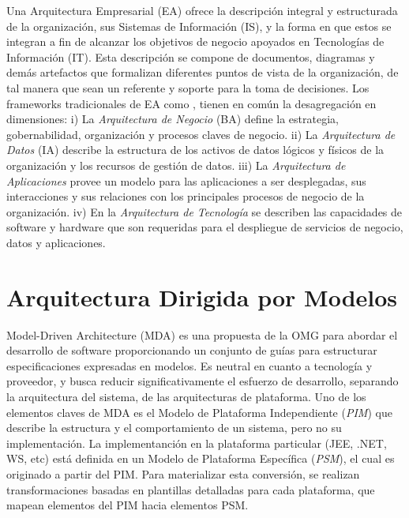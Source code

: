 Una Arquitectura Empresarial (EA) ofrece la descripci\'on integral y estructurada de la organizaci\'on, sus Sistemas de Informaci\'on (IS), y la forma en que estos se integran a fin de alcanzar los objetivos de negocio apoyados en Tecnolog\'ias de Informaci\'on (IT). Esta descripci\'on se compone de documentos, diagramas y dem\'as artefactos que formalizan diferentes puntos de vista de la organizaci\'on, de tal manera que sean un referente y soporte para la toma de decisiones. Los frameworks tradicionales de EA como \cite{Zachman:1987, DoDAF:2005, OpenGroup:2008}, tienen en com\'un la desagregaci\'on en dimensiones: i) La \textit{Arquitectura de Negocio} (BA) define la estrategia, gobernabilidad, organizaci\'on y procesos claves de negocio. ii) La \textit{Arquitectura de Datos} (IA) describe la estructura de los activos de datos l\'ogicos y f\'isicos de la organizaci\'on y los recursos de gesti\'on de datos. iii) La \textit{Arquitectura de Aplicaciones} provee un modelo para las aplicaciones a ser desplegadas, sus interacciones y sus relaciones con los principales procesos de negocio de la organizaci\'on. iv) En la \textit{Arquitectura de Tecnolog\'ia} se describen las capacidades de software y hardware que son requeridas para el despliegue de servicios de negocio, datos y aplicaciones.

\section{Arquitectura Dirigida por Modelos} \label{subsec:mda}

Model-Driven Architecture (MDA) es una propuesta de la OMG para abordar el desarrollo de software proporcionando un conjunto de gu\'ias para estructurar especificaciones expresadas en modelos. Es neutral en cuanto a tecnolog\'ia y proveedor, y busca reducir significativamente el esfuerzo de desarrollo, separando la arquitectura del sistema, de las arquitecturas de plataforma. Uno de los elementos claves de MDA es el Modelo de Plataforma Independiente (\textit{PIM}) que describe la estructura y el comportamiento de un sistema, pero no su implementaci\'on. La implementanci\'on en la plataforma particular (JEE, .NET, WS, etc) est\'a definida en un Modelo de Plataforma Espec\'ifica (\textit{PSM}), el cual es originado a partir del PIM. Para materializar esta conversi\'on, se realizan transformaciones basadas en plantillas detalladas para cada plataforma, que mapean elementos del PIM hacia elementos PSM.

